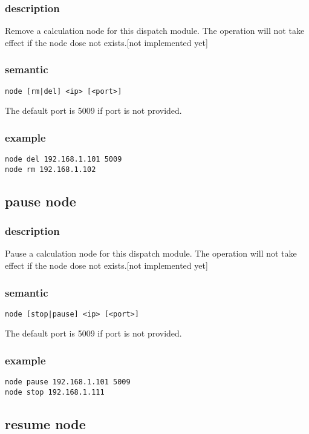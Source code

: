 \documentclass[10pt]{article}
\begin{document}
\subsubsection{description}
Remove a calculation node for this dispatch module. The operation will not take effect if the node 
dose not exists.[not implemented yet]

\subsubsection{semantic}
\begin{verbatim}
node [rm|del] <ip> [<port>]
\end{verbatim}
The default port is 5009 if port is not provided.

\subsubsection{example}
\begin{verbatim}
node del 192.168.1.101 5009
node rm 192.168.1.102
\end{verbatim}


\subsection{pause node}
\subsubsection{description}
Pause a calculation node for this dispatch module. The operation will not take effect if the node 
dose not exists.[not implemented yet]

\subsubsection{semantic}
\begin{verbatim}
node [stop|pause] <ip> [<port>]
\end{verbatim}
The default port is 5009 if port is not provided.

\subsubsection{example}
\begin{verbatim}
node pause 192.168.1.101 5009
node stop 192.168.1.111
\end{verbatim}

\subsection{resume node}
\end{document}
